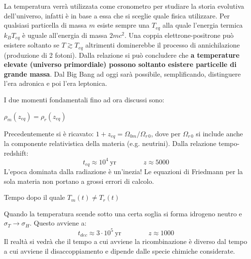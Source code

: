 \newpage
La temperatura verrà utilizzata come cronometro per studiare la storia evolutiva dell'universo, infatti è in base a essa che si sceglie quale fisica utilizzare. Per qualsiasi particella di massa $m$ esiste sempre una $T_{eq}$ alla quale l'energia termica $k_BT_{eq}$ è uguale all'energia di massa $2m c^2$. Una coppia elettrone-positrone può esistere soltanto se $T\gtrsim T_{eq}$ altrimenti dominerebbe il processo di annichilazione (produzione di 2 fotoni). Dalla relazione si può concludere che \textbf{a temperature elevate (universo primordiale) possono soltanto esistere particelle di grande massa}. Dal Big Bang ad oggi sarà possibile, semplificando, distinguere l'era adronica e poi l'era leptonica.

\vspace{1em}
I due momenti fondamentali fino ad ora discussi sono:
\begin{example}
    $\rho_m (z_{eq})=\rho_r(z_{eq})$
\end{example}
Precedentemente si è ricavato: $1+z_{eq}=\Omega_{0m}/\Omega_{r\, 0}$, dove per $\Omega_{r\, 0}$ si include anche la componente relativistica della materia (e.g. neutrini). Dalla relazione tempo-redshift:
$$
t_{eq} \approx 10^4 ~\mathrm{yr} \qquad\qquad z \approx 5000
$$
L'epoca dominata dalla radiazione è un'inezia! Le equazioni di Friedmann per la sola materia non portano a grossi errori di calcolo.

\begin{example}[Disaccoppiamento]
    Tempo dopo il quale $T_m(t)\neq T_r(t)$
\end{example}
Quando la temperatura scende sotto una certa soglia si forma idrogeno neutro e $\sigma_T \rightarrow \sigma_H$. Questo avviene a:
$$
t_{dec} \approx 3\cdot 10^5 ~\mathrm{yr} \qquad\qquad z \approx 1000
$$
Il realtà si vedrà che il tempo a cui avviene la ricombinazione è diverso dal tempo a cui avviene il disaccoppiamento e dipende dalle specie chimiche considerate.

